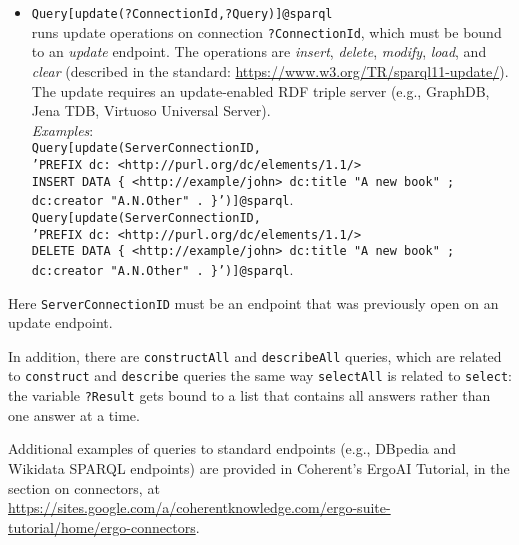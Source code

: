 \begin{itemize}
\item \texttt{Query[update(?ConnectionId,?Query)]@\bs{}sparql}\\
  runs update operations on connection \texttt{?ConnectionId}, which must
  be bound to an \emph{update} endpoint.  The operations are
  \emph{insert}, \emph{delete},
  \emph{modify}, \emph{load}, and \emph{clear} (described in the standard: 
  \url{https://www.w3.org/TR/sparql11-update/}). 
  The update requires an update-enabled RDF triple server (e.g., GraphDB,
  Jena TDB, Virtuoso Universal Server).      
  \\
  \emph{Examples}: 
  \\
  \texttt{Query[update(ServerConnectionID,\\
    \hspace*{22mm}
    'PREFIX dc: <http://purl.org/dc/elements/1.1/> 
    \\
    \hspace*{24mm}
          INSERT DATA \{ <http://example/john> dc:title "A new book" ;
    \\
    \hspace*{54mm}
    dc:creator	"A.N.Other" . \}')]@\bs{}sparql}.
  \\
  \texttt{Query[update(ServerConnectionID,\\
    \hspace*{22mm}
    'PREFIX dc: <http://purl.org/dc/elements/1.1/>
    \\
    \hspace*{24mm}
    DELETE DATA \{ <http://example/john> dc:title "A new book" ;
    \\
    \hspace*{54mm}
    dc:creator	"A.N.Other" . \}')]@\bs{}sparql}.
\end{itemize}
Here \texttt{ServerConnectionID} must be an endpoint that was previously
open on an update endpoint.

In addition, there are \texttt{constructAll} and \texttt{describeAll}
queries, which are related to \texttt{construct} and \texttt{describe}
queries the same way \texttt{selectAll} is related to \texttt{select}: the
variable \texttt{?Result} gets bound to a list that contains all answers
rather than one answer at a time.       

Additional examples of queries to standard endpoints (e.g., DBpedia and Wikidata
SPARQL endpoints) are provided in Coherent's ErgoAI Tutorial,
in the section on \ERGO connectors,
at
\url{https://sites.google.com/a/coherentknowledge.com/ergo-suite-tutorial/home/ergo-connectors}.

